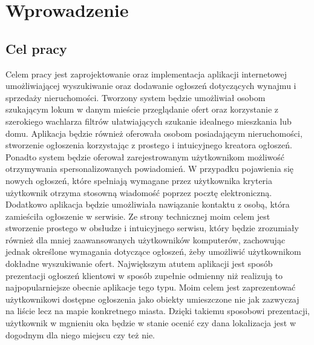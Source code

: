 \chapter{Wprowadzenie}
\label{cha:wprowadzenie}


\section{Cel pracy}
\label{sec:celPracy}
Celem pracy jest zaprojektowanie oraz implementacja aplikacji internetowej umożliwiającej wyszukiwanie oraz dodawanie ogłoszeń dotyczących wynajmu i sprzedaży nieruchomości. Tworzony system będzie umożliwiał osobom szukającym lokum w danym mieście przeglądanie ofert oraz korzystanie z szerokiego wachlarza filtrów ułatwiających szukanie idealnego mieszkania lub domu. Aplikacja będzie również oferowała osobom posiadającym nieruchomości, stworzenie ogłoszenia korzystając z prostego i intuicyjnego kreatora ogłoszeń. Ponadto system będzie oferował zarejestrowanym użytkownikom możliwość otrzymywania  spersonalizowanych powiadomień. W przypadku pojawienia się nowych ogłoszeń, które spełniają wymagane przez użytkownika kryteria użytkownik otrzyma stosowną wiadomość poprzez pocztę elektroniczną. Dodatkowo aplikacja będzie umożliwiała nawiązanie kontaktu z osobą, która zamieściła ogłoszenie w serwisie. Ze strony technicznej moim celem jest stworzenie prostego w obsłudze i intuicyjnego serwisu, który będzie zrozumiały również dla mniej zaawansowanych użytkowników komputerów, zachowując jednak określone wymagania dotyczące ogłoszeń, żeby umożliwić użytkownikom dokładne wyszukiwanie ofert. Największym atutem aplikacji jest sposób prezentacji ogłoszeń klientowi w sposób zupełnie odmienny niż realizują to najpopularniejsze obecnie aplikacje tego typu. Moim celem jest zaprezentować użytkownikowi dostępne ogłoszenia jako obiekty umieszczone nie jak zazwyczaj na liście lecz na mapie konkretnego miasta. Dzięki takiemu sposobowi prezentacji, użytkownik w mgnieniu oka będzie w stanie ocenić czy dana lokalizacja jest w dogodnym dla niego miejscu czy też nie.


